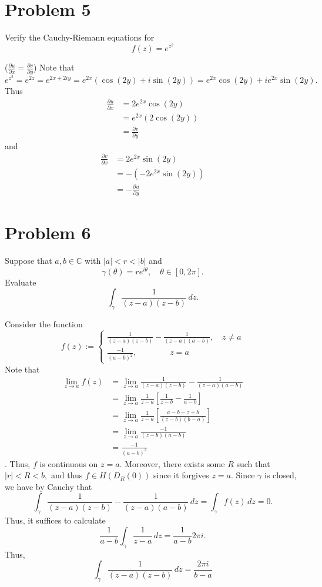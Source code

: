 \documentclass[11pt]{article}
\newcommand{\bbC}{\mathbb{C}}
\begin{document}
\section*{Problem 5}
\begin{problem}
    Verify the Cauchy-Riemann equations for 
    \[f(z) = e^{z^2}\]
\end{problem}
\begin{solution}
    ($\frac{\partial u}{\partial x} = \frac{\partial v}{\partial y}$) Note that 
    \[e^{z^2} = e^{2z}= e^{2x + 2iy} = e^{2x}(\cos(2y) + i\sin(2y)) = e^{2x}\cos(2y) + ie^{2x}\sin(2y).\] Thus
    \begin{align*}
      \frac{\partial u}{\partial x}  &=   2e^{2x}\cos(2y)\\
      &= e^{2x}(2\cos(2y))\\
      &= \frac{\partial v}{\partial y}
    \end{align*}
    and 
    \begin{align*}
        \frac{\partial v}{\partial x} &= 2e^{2x}\sin(2y)\\
        &= -(-2e^{2x}\sin(2y))\\
        &= -\frac{\partial u}{\partial y}
    \end{align*}
\end{solution}

\newpage
\section*{Problem 6}
\begin{problem}
    Suppose that $a,b \in \bbC$ with $|a| < r < |b|$ and 
    \[\gamma(\theta) = re^{i\theta}, \quad \theta \in [0, 2\pi].\] Evaluate 
    \[\int_\gamma \frac{1}{(z - a)(z-b)}\, dz.\]
\end{problem}
\begin{solution}
    Consider the function
    \[f(z):= \begin{cases}
        \frac{1}{(z - a)(z-b)} - \frac{1}{(z-a)(a-b)}, \quad z\neq a\\
        \frac{-1}{(a-b)^2}, \qquad \qquad z = a
    \end{cases}\]
    Note that 
\begin{align*}
    \lim_{z\to a} f(z) &= \lim_{z\to a}\frac{1}{(z - a)(z-b)} - \frac{1}{(z-a)(a-b)}\\
    &= \lim_{z\to a} \frac{1}{z-a}\left[\frac{1}{z-b} - \frac{1}{a-b}\right]\\
    &= \lim_{z\to a} \frac{1}{z-a}\left[\frac{a-b - z + b}{(z-b)(b-a)}\right]\\
    &= \lim_{z\to a} \frac{-1}{(z-b)(a-b)}\\
    &= \frac{-1}{(a-b)^2}
\end{align*}. Thus, $f$ is continuous on $z = a.$ Moreover, there exists some $R$ such that $|r| < R < b,$ and thus $f\in H(D_R(0))$ since it forgives $z = a.$ Since $\gamma$ is closed, we have by Cauchy that 
\[\int_\gamma \frac{1}{(z - a)(z-b)} - \frac{1}{(z-a)(a-b)}\, dz = \int_\gamma f(z)\,dz = 0.\] Thus, it suffices to calculate 
\[\frac{1}{a-b}\int_\gamma \frac{1}{z - a}\,dz = \frac{1}{a-b}2\pi i.\] Thus, 
\[\int_\gamma \frac{1}{(z-a)(z-b)}\, dz = \frac{2\pi i}{b-a}\]
\end{solution}
\end{document}
